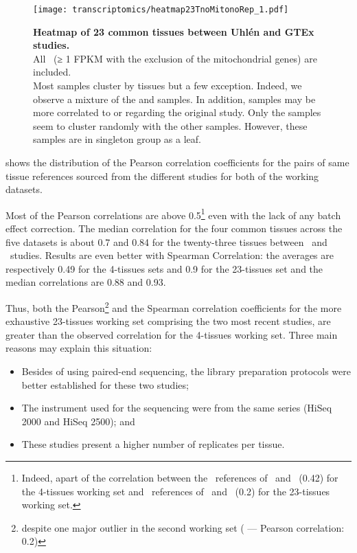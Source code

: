 \begin{figure}[!htpb]
    \texttt{[image: transcriptomics/heatmap23TnoMitonoRep\_1.pdf]}\centering
    \caption[Heatmap of 23 common tissues between Uhlén and GTEx studies]%
    {\label{fig:noMitoNoRep23T}%
    \textbf{Heatmap of 23 common tissues between Uhlén and GTEx studies.}\\
    All \pcgs\ (≥ 1 FPKM with the exclusion of the mitochondrial
    genes) are included.\\Most samples cluster by tissues but a few exception.
    Indeed, we observe a mixture of the 
    and  samples.
    In addition,  samples may be more correlated to
     or  regarding the original study.
    Only the  samples seem to cluster randomly with the other
    samples. However, these samples are in singleton group as a leaf.}
\end{figure}

 shows the distribution of the Pearson correlation
coefficients for the pairs of same tissue references
sourced from the different studies
for both of the working datasets.

Most of the Pearson correlations are above 0.5\footnote{Indeed, apart of the
correlation between the \Testis\ references of \castle\ and \vt\ (0.42)
for the 4-tissues working set and
\Salivary\ references of \uhlen\ and \gtex\ (0.2)
for the 23-tissues working set.}
even with the lack of any batch effect correction.
The median correlation for the four common tissues across the five datasets is
about 0.7 and 0.84 for the twenty-three tissues between \uhlen\ and \gtex\ studies.
Results are even better with Spearman Correlation:
the averages are respectively 0.49 for the 4-tissues sets
and 0.9 for the 23-tissues set and
the median correlations are 0.88 and 0.93.

Thus, both the Pearson\footnote{despite one major outlier in the second
working set ( --- Pearson correlation: 0.2)} and the
Spearman correlation coefficients for the more exhaustive 23-tissues working set
comprising the two most recent studies,
are greater than the observed correlation for the 4-tissues working set.
Three main reasons may explain this situation:
\begin{itemize}[topsep=0pt,nosep]
    \item Besides of using paired-end sequencing,
        the library preparation protocols were better established
        for these two studies;
    \item The instrument used for the sequencing were
        from the same series (HiSeq 2000 and HiSeq 2500); and
    \item These studies present a higher number of replicates per tissue.
\end{itemize}

